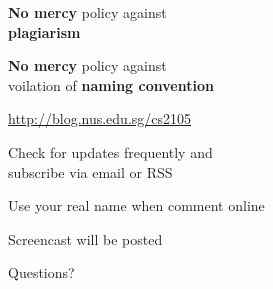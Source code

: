 \documentclass[20pt,handout,notes=show]{beamer}
\begin{document}
\begin{frame}
\begin{center}
\large
	\textbf{No mercy} policy against\\\textbf{plagiarism}
\end{center}
\end{frame}

\begin{frame}
\begin{center}
\large
	\textbf{No mercy} policy against\\voilation of \textbf{naming convention}
\end{center}
\end{frame}

\begin{frame}
\begin{center}
\large
	\url{http://blog.nus.edu.sg/cs2105}
\end{center}
\end{frame}

\begin{frame}
\begin{center}
\large
Check for updates frequently and\\subscribe via email or RSS
\end{center}
\end{frame}

\begin{frame}
\begin{center}
\large Use your real name when comment online
\end{center}
\end{frame}

\begin{frame}
\begin{center}
\large
Screencast will be posted
\end{center}
\end{frame}

\begin{frame}
\begin{center}
\large
Questions?
\end{center}
\end{frame}
\end{document}

